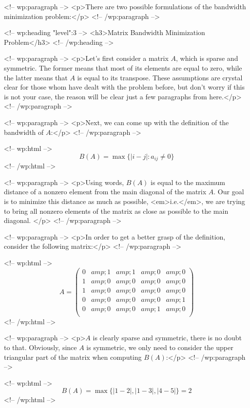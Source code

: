 <!-- wp:paragraph -->
<p>There are two possible formulations of the bandwidth minimization problem:</p>
<!-- /wp:paragraph -->

<!-- wp:heading {"level":3} -->
<h3>Matrix Bandwidth Minimization Problem</h3>
<!-- /wp:heading -->

<!-- wp:paragraph -->
<p>Let's first consider a matrix $A$, which is sparse and symmetric. The former means that most of its elements are equal to zero, while the latter means that $A$ is equal to its transpose. These assumptions are crystal clear for those whom have dealt with the problem before, but don't worry if this is not your case, the reason will be clear just a few paragraphs from here.</p>
<!-- /wp:paragraph -->

<!-- wp:paragraph -->
<p>Next, we can come up with the definition of the bandwidth of $A$:</p>
<!-- /wp:paragraph -->

<!-- wp:html -->
$$ B(A) = \max\{|i - j|: a_{ij} \neq 0 \} $$
<!-- /wp:html -->

<!-- wp:paragraph -->
<p>Using words, $B(A)$ is equal to the maximum distance of a nonzero element from the main diagonal of the matrix $A$. Our goal is to minimize this distance as much as possible, <em>i.e.</em>, we are trying to bring all nonzero elements of the matrix as close as possible to the main diagonal. </p>
<!-- /wp:paragraph -->

<!-- wp:paragraph -->
<p>In order to get a better grasp of the definition, consider the following matrix:</p>
<!-- /wp:paragraph -->

<!-- wp:html -->
$$
A = 
\begin{pmatrix}
 0 &amp; 1 &amp; 1 &amp; 0 &amp; 0\\ 
 1 &amp; 0 &amp; 0 &amp; 0 &amp; 0\\ 
 1 &amp; 0 &amp; 0 &amp; 0 &amp; 0\\
 0 &amp; 0 &amp; 0 &amp; 0 &amp; 1\\
 0 &amp; 0 &amp; 0 &amp; 1 &amp; 0\\
 \end{pmatrix}
$$
<!-- /wp:html -->

<!-- wp:paragraph -->
<p>$A$ is clearly sparse and symmetric, there is no doubt to that. Obviously, since $A$ is symmetric, we only need to consider the upper triangular part of the matrix when computing $B(A)$:</p>
<!-- /wp:paragraph -->

<!-- wp:html -->
$$ B(A) = \max\{|1 - 2|, |1 - 3|, |4 - 5|\} = 2 $$
<!-- /wp:html -->

